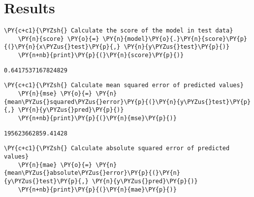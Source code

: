     \section*{Results}

        \begin{tcolorbox}[breakable, size=fbox, boxrule=1pt, pad at break*=1mm,colback=cellbackground, colframe=cellborder]
    \begin{Verbatim}[commandchars=\\\{\}]
    \PY{c+c1}{\PYZsh{} Calculate the score of the model in test data}
    \PY{n}{score} \PY{o}{=} \PY{n}{model}\PY{o}{.}\PY{n}{score}\PY{p}{(}\PY{n}{x\PYZus{}test}\PY{p}{,} \PY{n}{y\PYZus{}test}\PY{p}{)}
    \PY{n+nb}{print}\PY{p}{(}\PY{n}{score}\PY{p}{)}
    \end{Verbatim}
    \end{tcolorbox}
    
        \begin{Verbatim}[commandchars=\\\{\}]
    0.6417537167824829
        \end{Verbatim}
    
        \begin{tcolorbox}[breakable, size=fbox, boxrule=1pt, pad at break*=1mm,colback=cellbackground, colframe=cellborder]
    \begin{Verbatim}[commandchars=\\\{\}]
    \PY{c+c1}{\PYZsh{} Calculate mean squared error of predicted values}
    \PY{n}{mse} \PY{o}{=} \PY{n}{mean\PYZus{}squared\PYZus{}error}\PY{p}{(}\PY{n}{y\PYZus{}test}\PY{p}{,} \PY{n}{y\PYZus{}pred}\PY{p}{)}
    \PY{n+nb}{print}\PY{p}{(}\PY{n}{mse}\PY{p}{)}
    \end{Verbatim}
    \end{tcolorbox}
    
        \begin{Verbatim}[commandchars=\\\{\}]
    195623662859.41428
        \end{Verbatim}
    
        \begin{tcolorbox}[breakable, size=fbox, boxrule=1pt, pad at break*=1mm,colback=cellbackground, colframe=cellborder]
    \begin{Verbatim}[commandchars=\\\{\}]
    \PY{c+c1}{\PYZsh{} Calculate absolute squared error of predicted values}
    \PY{n}{mae} \PY{o}{=} \PY{n}{mean\PYZus{}absolute\PYZus{}error}\PY{p}{(}\PY{n}{y\PYZus{}test}\PY{p}{,} \PY{n}{y\PYZus{}pred}\PY{p}{)}
    \PY{n+nb}{print}\PY{p}{(}\PY{n}{mae}\PY{p}{)}
    \end{Verbatim}
    \end{tcolorbox}
    
